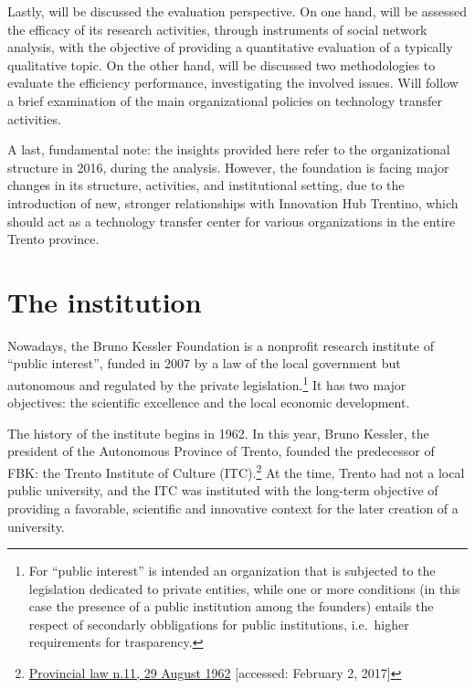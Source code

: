 Lastly, will be discussed the evaluation perspective. On one hand, will be assessed the efficacy of its research activities, through instruments of social network analysis, with the objective of providing a quantitative evaluation of a typically qualitative topic. On the other hand, will be discussed two methodologies to evaluate the efficiency performance, investigating the involved issues. Will follow a brief examination of the main organizational policies on technology transfer activities.

A last, fundamental note: the insights provided here refer to the organizational structure in 2016, during the analysis. However, the foundation is facing major changes in its structure, activities, and institutional setting, due to the introduction of new, stronger relationships with Innovation Hub Trentino, which should act as a technology transfer center for various organizations in the entire Trento province. 

\section{The institution}

Nowadays, the Bruno Kessler Foundation is a nonprofit research institute of \enquote{public interest}, funded in 2007 by a law of the local government but autonomous and regulated by the private legislation.\footnote{For \enquote{public interest} is intended an organization that is subjected to the legislation dedicated to private entities, while one or more conditions (in this case the presence of a public institution among the founders) entails the respect of secondarly obbligations for public institutions, i.e.\ higher requirements for trasparency.} It has two major objectives: the scientific excellence and the local economic development.

The history of the institute begins in 1962. In this year, Bruno Kessler, the president of the Autonomous Province of Trento, founded the predecessor of FBK: the Trento Institute of Culture (ITC).\footnote{
	\href{http://www.consiglio.provincia.tn.it/leggi-e-archivi/codice-provinciale/archivio/Pages/Legge\%20provinciale\%2029\%20agosto\%201962,\%20n.\%2011_565.aspx}
	{Provincial law n.11, 29 August 1962}
	[accessed: February 2, 2017]
} At the time, Trento had not a local public university, and the ITC was instituted with the long-term objective of providing a favorable, scientific and innovative context for the later creation of a university. 

